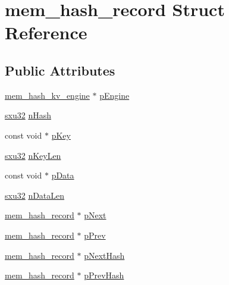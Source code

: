 \hypertarget{structmem__hash__record}{\section{mem\-\_\-hash\-\_\-record Struct Reference}
\label{d3/d0c/structmem__hash__record}
}
\subsection*{Public Attributes}
\begin{DoxyCompactItemize}
\item 
\hyperlink{structmem__hash__kv__engine}{mem\-\_\-hash\-\_\-kv\-\_\-engine} $\ast$ \hyperlink{structmem__hash__record_aa77c00d15c836f9125070cad5f29922f}{p\-Engine}
\item 
\hyperlink{unqlite_8c_abc5a8a3f345c200c98c485551f49666e}{sxu32} \hyperlink{structmem__hash__record_a44246b0d237c780318c3353bd08d892e}{n\-Hash}
\item 
const void $\ast$ \hyperlink{structmem__hash__record_ae33b1c9e1f10f320881465387b194660}{p\-Key}
\item 
\hyperlink{unqlite_8c_abc5a8a3f345c200c98c485551f49666e}{sxu32} \hyperlink{structmem__hash__record_a65b65697dbea9575e1ee771c57ac349d}{n\-Key\-Len}
\item 
const void $\ast$ \hyperlink{structmem__hash__record_afc44824ea642e2bf960d6506aed6539c}{p\-Data}
\item 
\hyperlink{unqlite_8c_abc5a8a3f345c200c98c485551f49666e}{sxu32} \hyperlink{structmem__hash__record_ad40f9556316fe98496c5418e1f3d23d4}{n\-Data\-Len}
\item 
\hyperlink{structmem__hash__record}{mem\-\_\-hash\-\_\-record} $\ast$ \hyperlink{structmem__hash__record_a58735495fc38b3b07358e96c7f2ade6b}{p\-Next}
\item 
\hyperlink{structmem__hash__record}{mem\-\_\-hash\-\_\-record} $\ast$ \hyperlink{structmem__hash__record_a62e5da2b57ba4417b26cf175970e5055}{p\-Prev}
\item 
\hyperlink{structmem__hash__record}{mem\-\_\-hash\-\_\-record} $\ast$ \hyperlink{structmem__hash__record_abe7d59dec4d896ff89d7b022d17ca687}{p\-Next\-Hash}
\item 
\hyperlink{structmem__hash__record}{mem\-\_\-hash\-\_\-record} $\ast$ \hyperlink{structmem__hash__record_a3683cef4dcce93469fb65f48a06ba867}{p\-Prev\-Hash}
\end{DoxyCompactItemize}


